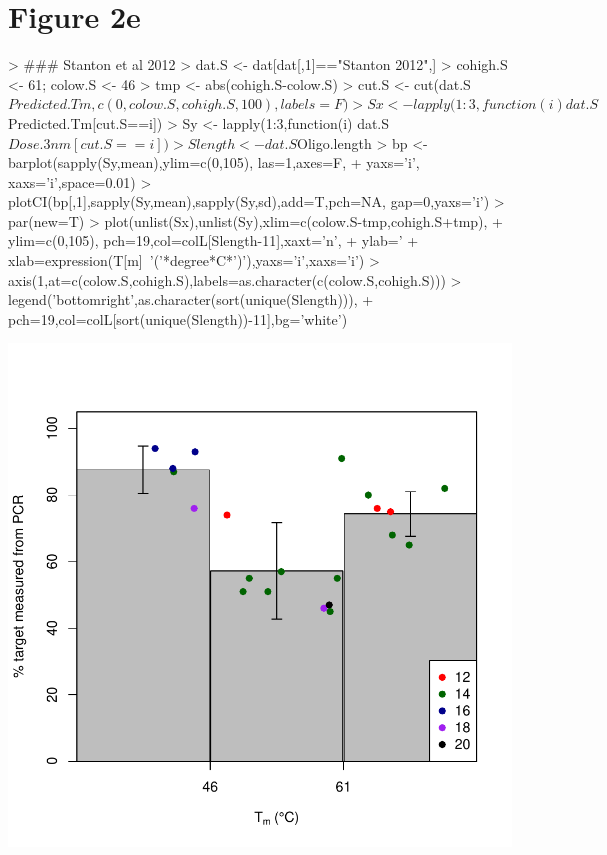 \documentclass{article}
\begin{document}
\section*{Figure 2e}
\begin{Schunk}
\begin{Sinput}
> ### Stanton et al 2012
> dat.S <- dat[dat[,1]=="Stanton 2012",]
> cohigh.S <- 61; colow.S <- 46
> tmp <- abs(cohigh.S-colow.S)
> cut.S <- cut(dat.S$Predicted.Tm,c(0,colow.S,cohigh.S,100),labels=F)
> Sx <- lapply(1:3,function(i)dat.S$Predicted.Tm[cut.S==i])
> Sy <- lapply(1:3,function(i) dat.S$Dose.3nm[cut.S==i])
> Slength <- dat.S$Oligo.length
> bp <- barplot(sapply(Sy,mean),ylim=c(0,105), las=1,axes=F,
+               yaxs='i', xaxs='i',space=0.01)
> plotCI(bp[,1],sapply(Sy,mean),sapply(Sy,sd),add=T,pch=NA, gap=0,yaxs='i')
> par(new=T)
> plot(unlist(Sx),unlist(Sy),xlim=c(colow.S-tmp,cohigh.S+tmp),
+      ylim=c(0,105), pch=19,col=colL[Slength-11],xaxt='n',
+      ylab='%
+      xlab=expression(T[m]~'('*degree*C*')'),yaxs='i',xaxs='i')
> axis(1,at=c(colow.S,cohigh.S),labels=as.character(c(colow.S,cohigh.S)))
> legend('bottomright',as.character(sort(unique(Slength))),
+        pch=19,col=colL[sort(unique(Slength))-11],bg='white')
\end{Sinput}
\end{Schunk}
\includegraphics{Vignette2-010}
\end{document}

